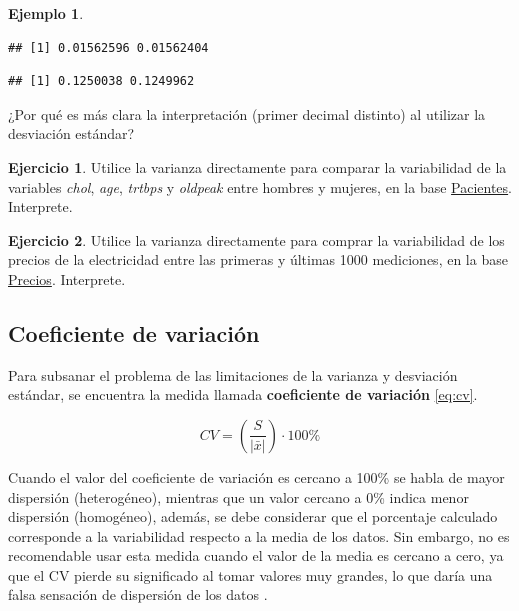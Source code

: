 \documentclass[
  11pt,
]{book}
\newenvironment{Shaded}{\begin{snugshade}}{\end{snugshade}}
\newcommand{\FunctionTok}[1]{\textcolor[rgb]{0.13,0.29,0.53}{\textbf{#1}}}
\newcommand{\NormalTok}[1]{#1}
\newcommand{\SpecialCharTok}[1]{\textcolor[rgb]{0.81,0.36,0.00}{\textbf{#1}}}
\theoremstyle{definition}
\theoremstyle{definition}
\newtheorem{example}{Ejemplo}[chapter]
\theoremstyle{definition}
\newtheorem{exercise}{Ejercicio}[chapter]
\theoremstyle{definition}
\theoremstyle{remark}
\begin{document}
\begin{example}
\begin{enumerate}
\begin{verbatim}
## [1] 0.01562596 0.01562404
\end{verbatim}

\begin{Shaded}
\end{Shaded}

\begin{verbatim}
## [1] 0.1250038 0.1249962
\end{verbatim}

  ¿Por qué es más clara la interpretación (primer decimal distinto) al utilizar la desviación estándar?
\end{enumerate}

\end{example}

\begin{exercise}
Utilice la varianza directamente para comparar la variabilidad de la variables \emph{chol}, \emph{age}, \emph{trtbps} y \emph{oldpeak} entre hombres y mujeres, en la base \hyperref[Pacientes]{Pacientes}. Interprete.
\end{exercise}

\begin{exercise}
Utilice la varianza directamente para comprar la variabilidad de los precios de la electricidad entre las primeras y últimas 1000 mediciones, en la base \hyperref[PreciosElectricidad]{Precios}. Interprete.
\end{exercise}

\subsection{Coeficiente de variación}\label{topicos-medidas-escala-coeficiente-variacion}

Para subsanar el problema de las limitaciones de la varianza y desviación estándar, se encuentra la medida llamada \textbf{coeficiente de variación} \eqref{eq:cv}.

\begin{equation}
CV = \left(\frac{S}{|\bar{x}|}\right)\cdot 100\%
\label{eq:cv}
\end{equation}

Cuando el valor del coeficiente de variación es cercano a 100\% se habla de mayor dispersión (heterogéneo), mientras que un valor cercano a 0\% indica menor dispersión (homogéneo), además, se debe considerar que el porcentaje calculado corresponde a la variabilidad respecto a la media de los datos. Sin embargo, no es recomendable usar esta medida cuando el valor de la media es cercano a cero, ya que el CV pierde su significado al tomar valores muy grandes, lo que daría una falsa sensación de dispersión de los datos \citep[página 95]{anderson}.
\end{document}
